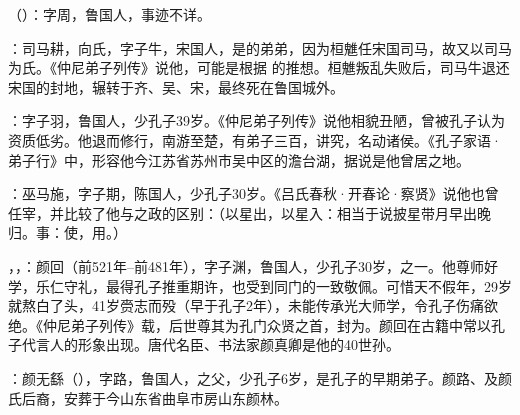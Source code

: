（）：字周，鲁国人，事迹不详。

：司马耕，向氏，字子牛，宋国人，是的弟弟，因为桓魋任宋国司马，故又以司马为氏。《仲尼弟子列传》说他，可能是根据  的推想。桓魋叛乱失败后，司马牛退还宋国的封地，辗转于齐、吴、宋，最终死在鲁国城外。

：字子羽，鲁国人，少孔子39岁。《仲尼弟子列传》说他相貌丑陋，曾被孔子认为资质低劣。他退而修行，南游至楚，有弟子三百，讲究，名动诸侯。《孔子家语·弟子行》中，形容他今江苏省苏州市吴中区的澹台湖，据说是他曾居之地。

：巫马施，字子期，陈国人，少孔子30岁。《吕氏春秋·开春论·察贤》说他也曾任宰，并比较了他与之政的区别：（以星出，以星入：相当于说披星带月早出晚归。事：使，用。）

，，：颜回（前521年--前481年），字子渊，鲁国人，少孔子30岁，之一。他尊师好学，乐仁守礼，最得孔子推重期许，也受到同门的一致敬佩。可惜天不假年，29岁就熬白了头，41岁赍志而殁（早于孔子2年），未能传承光大师学，令孔子伤痛欲绝。《仲尼弟子列传》载，后世尊其为孔门众贤之首，封为。颜回在古籍中常以孔子代言人的形象出现。唐代名臣、书法家颜真卿是他的40世孙。%

：颜无繇（），字路，鲁国人，之父，少孔子6岁，是孔子的早期弟子。颜路、及颜氏后裔，安葬于今山东省曲阜市房山东颜林。

